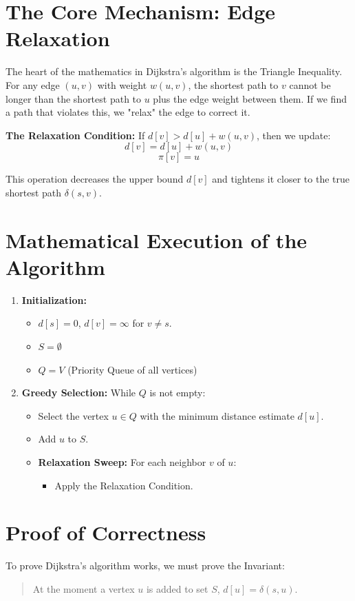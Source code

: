 \documentclass{article}
\begin{document}
\section{The Core Mechanism: Edge Relaxation}
The heart of the mathematics in Dijkstra's algorithm is the Triangle Inequality.
For any edge $(u, v)$ with weight $w(u, v)$, the shortest path to $v$ cannot be longer than the shortest path to $u$ plus the edge weight between them. If we find a path that violates this, we "relax" the edge to correct it.

\textbf{The Relaxation Condition:}
If $d[v] > d[u] + w(u, v)$, then we update:
\[ d[v] = d[u] + w(u, v) \]
\[ \pi[v] = u \]

This operation decreases the upper bound $d[v]$ and tightens it closer to the true shortest path $\delta(s, v)$.

\section{Mathematical Execution of the Algorithm}
\begin{enumerate}
    \item \textbf{Initialization:}
    \begin{itemize}
        \item $d[s] = 0$, $d[v] = \infty$ for $v \neq s$.
        \item $S = \emptyset$
        \item $Q = V$ (Priority Queue of all vertices)
    \end{itemize}

    \item \textbf{Greedy Selection:}
    While $Q$ is not empty:
    \begin{itemize}
        \item Select the vertex $u \in Q$ with the minimum distance estimate $d[u]$.
        \item Add $u$ to $S$.
        \item \textbf{Relaxation Sweep:}
        For each neighbor $v$ of $u$:
        \begin{itemize}
            \item Apply the Relaxation Condition.
        \end{itemize}
    \end{itemize}
\end{enumerate}

\section{Proof of Correctness}
To prove Dijkstra's algorithm works, we must prove the Invariant:
\begin{quote}
    At the moment a vertex $u$ is added to set $S$, $d[u] = \delta(s, u)$.
\end{quote}
\end{document}
